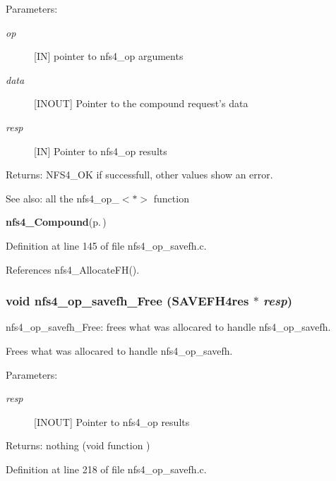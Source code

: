 \begin{Desc}
\item[Parameters:]
\begin{description}
\item[{\em op}][IN] pointer to nfs4\_\-op arguments \item[{\em data}][INOUT] Pointer to the compound request's data \item[{\em resp}][IN] Pointer to nfs4\_\-op results\end{description}
\end{Desc}
\begin{Desc}
\item[Returns:]NFS4\_\-OK if successfull, other values show an error.\end{Desc}
\begin{Desc}
\item[See also:]all the nfs4\_\-op\_\-$<$$\ast$$>$ function 

{\bf nfs4\_\-Compound}{\rm (p.\,\pageref{nfs4__Compound_8c_a4})} \end{Desc}


Definition at line 145 of file nfs4\_\-op\_\-savefh.c.

References nfs4\_\-Allocate\-FH().
\subsubsection{\setlength{\rightskip}{0pt plus 5cm}void nfs4\_\-op\_\-savefh\_\-Free (SAVEFH4res $\ast$ {\em resp})}\label{nfs4__op__savefh_8c_a1}


nfs4\_\-op\_\-savefh\_\-Free: frees what was allocared to handle nfs4\_\-op\_\-savefh.

Frees what was allocared to handle nfs4\_\-op\_\-savefh.

\begin{Desc}
\item[Parameters:]
\begin{description}
\item[{\em resp}][INOUT] Pointer to nfs4\_\-op results\end{description}
\end{Desc}
\begin{Desc}
\item[Returns:]nothing (void function ) \end{Desc}


Definition at line 218 of file nfs4\_\-op\_\-savefh.c.